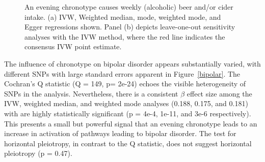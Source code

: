\documentclass[journal,article,submit,moreauthors,pdftex]{Definitions/mdpi}
\begin{document}
\begin{figure}[htbp]
\begin{subfigure}{.5\linewidth}
\caption{}
\label{beerLoo}
\end{subfigure}
\caption{An evening chronotype causes weekly (alcoholic) beer and/or cider intake. (a) IVW, Weighted median, mode, weighted mode, and Egger regressions shown. Panel (b) depicts leave-one-out sensitivity analyses with the IVW method, where the red line indicates the consensus IVW point estimate.}
\label{beer}
\end{figure}
The influence of chronotype on bipolar disorder appears substantially varied, with different SNPs with large standard errors apparent in Figure~\ref{bipolar}. The Cochran's Q statistic (Q = 149, p= 2e-24) echoes the visible heterogeneity of SNPs in the analysis. Nevertheless, there is a consistent $\beta$ effect size among the IVW, weighted median, and weighted mode analyses (0.188, 0.175, and 0.181) with are highly statistically significant (p = 4e-4, 1e-11, and 3e-6 respectively). This presents a small but powerful signal that an evening chronotype leads to an increase in activation of pathways leading to bipolar disorder. The test for horizontal pleiotropy, in contrast to the Q statistic, does not suggest horizontal pleiotropy (p = 0.47).
\end{document}
